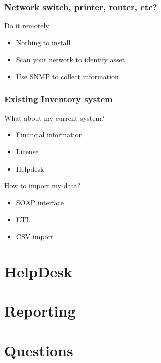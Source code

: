 \documentclass{beamer}
\begin{document}
\begin{frame}

    \frametitle{Network switch, printer, router, etc?}

    \begin{block}{Do it remotely}
        \begin{itemize}
            \item Nothing to install
            \item Scan your network to identify asset
            \item Use SNMP to collect information
        \end{itemize}
    \end{block}

\end{frame}

\begin{frame}

    \frametitle{Existing Inventory system}

    \begin{block}{What about my current system?}
        \begin{itemize}
            \item Financial information
            \item License
            \item Helpdesk
        \end{itemize}
    \end{block}


    \begin{block}{How to import my data?}
        \begin{itemize}
            \item SOAP interface
            \item ETL
            \item CSV import
        \end{itemize}
    \end{block}

\end{frame}



\section{HelpDesk}
\section{Reporting}
\section{Questions}
\end{document}
